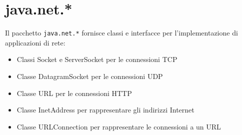 \documentclass[a4paper, titlepage]{article}
\begin{document}
\begin{frontespizio}
\Scuola{}
\end{frontespizio}
\tableofcontents

\newpage

\section{java.net.*}

	Il pacchetto \lstinline!java.net.*!  fornisce classi e interfacce per l'implementazione di 
	applicazioni di rete:
	\begin{itemize}
		\item Classi Socket e ServerSocket per le connessioni TCP
		\item Classe DatagramSocket per le connessioni UDP
		\item Classe URL per le connessioni HTTP
		\item Classe InetAddress per rappresentare gli indirizzi Internet
		\item Classe URLConnection per rappresentare le connessioni a un URL
	\end{itemize}		
	
\end{document}
